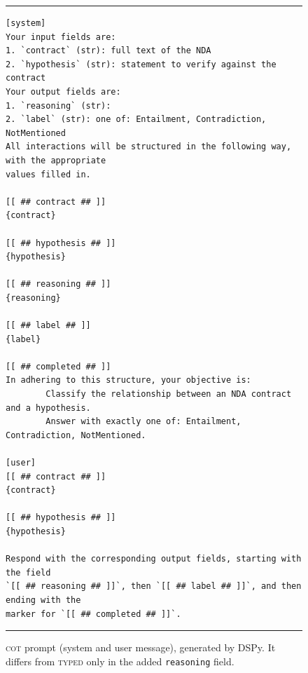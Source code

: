 \documentclass[11pt]{article}
\newcommand{\typed}{\textsc{typed}}
\begin{document}
\begin{figure}[H]
\centering
\begin{minipage}{0.92\textwidth}
\footnotesize
\hrule\vspace{4pt}
\begin{verbatim}
[system]
Your input fields are:
1. `contract` (str): full text of the NDA
2. `hypothesis` (str): statement to verify against the contract
Your output fields are:
1. `reasoning` (str):
2. `label` (str): one of: Entailment, Contradiction, NotMentioned
All interactions will be structured in the following way, with the appropriate
values filled in.

[[ ## contract ## ]]
{contract}

[[ ## hypothesis ## ]]
{hypothesis}

[[ ## reasoning ## ]]
{reasoning}

[[ ## label ## ]]
{label}

[[ ## completed ## ]]
In adhering to this structure, your objective is:
        Classify the relationship between an NDA contract and a hypothesis.
        Answer with exactly one of: Entailment, Contradiction, NotMentioned.

[user]
[[ ## contract ## ]]
{contract}

[[ ## hypothesis ## ]]
{hypothesis}

Respond with the corresponding output fields, starting with the field
`[[ ## reasoning ## ]]`, then `[[ ## label ## ]]`, and then ending with the
marker for `[[ ## completed ## ]]`.
\end{verbatim}
\vspace{2pt}\hrule
\end{minipage}
\caption{\textsc{cot} prompt (system and user message), generated by DSPy.
It differs from \typed{} only in the added \texttt{reasoning} field.}
\label{fig:prompt_cot}
\end{figure}
\end{document}
